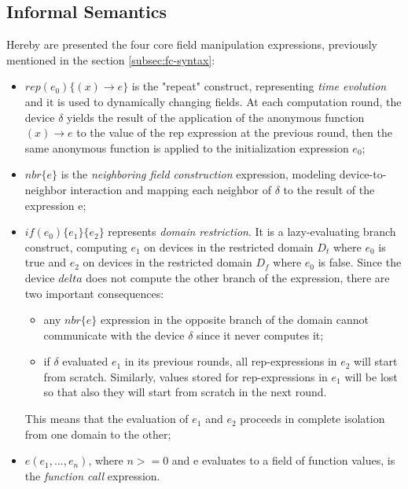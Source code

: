 \subsection{Informal Semantics}
Hereby are presented the four core field manipulation expressions, previously mentioned in the section \ref{subsec:fc-syntax}:

\begin{itemize}
    \item $rep(e_0)\{(x) \rightarrow e\}$ is the "repeat" construct, representing \textit{time evolution} and it is used to dynamically changing fields. At each computation round,
          the device $\delta$ yields the result of the application of the anonymous function $(x) \rightarrow e$ to the value of the rep expression at the previous round, then the same anonymous function is
          applied to the initialization expression $e_0$;
    \item $nbr\{e\}$ is the \textit{neighboring field construction} expression, modeling device-to-neighbor interaction and mapping each neighbor of $\delta$ to the result of the expression e;
    \item $if(e_0)\{e_1\}\{e_2\}$ represents \textit{domain restriction}. It is a lazy-evaluating branch construct, computing $e_1$ on devices in the restricted domain $D_t$ where $e_0$ is true and $e_2$ on devices in the restricted domain $D_f$ where $e_0$ is false.
          Since the device $delta$ does not compute the other branch of the expression, there are two important consequences:
          \begin{itemize}
              \item any $nbr\{e\}$ expression in the opposite branch of the domain cannot communicate with the device $\delta$ since it never computes it;
              \item if $\delta$ evaluated $e_1$ in its previous rounds, all rep-expressions in $e_2$ will start from scratch.
                    Similarly, values stored for rep-expressions in $e_1$ will be lost so that also they will start from scratch in the next round.
          \end{itemize}
          This means that the evaluation of $e_1$ and $e_2$ proceeds in complete isolation from one domain to the other;
    \item $e(e_1, ..., e_n)$, where $n>=0$ and e evaluates to a field of function values, is the \textit{function call} expression.
\end{itemize}




